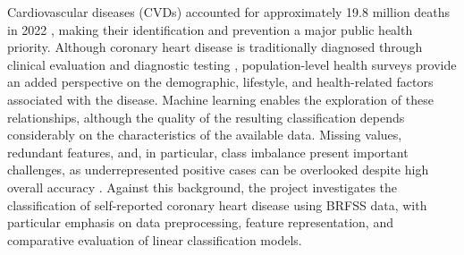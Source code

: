 Cardiovascular diseases (CVDs) accounted for approximately 19.8 million deaths in 2022 \cite{who2025}, making their identification and prevention a major public health priority. Although coronary heart disease is traditionally diagnosed through clinical evaluation and diagnostic testing \cite{chestpain2023}, population-level health surveys provide an added perspective on the demographic, lifestyle, and health-related factors associated with the disease. Machine learning enables the exploration of these relationships, although the quality of the resulting classification depends considerably on the characteristics of the available data. Missing values, redundant features, and, in particular, class imbalance present important challenges, as underrepresented positive cases can be overlooked despite high overall accuracy \cite{brfss2026}. Against this background, the project investigates the classification of self-reported coronary heart disease using BRFSS data, with particular emphasis on data preprocessing, feature representation, and comparative evaluation of linear classification models.